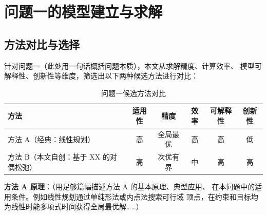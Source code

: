 %
%

\section{问题一的模型建立与求解}

\subsection{方法对比与选择}


针对问题一（此处用一句话概括问题本质），本文从求解精度、计算效率、
模型可解释性、创新性等维度，筛选出以下两种候选方法进行对比：

\begin{table}[htbp]
  \centering
  \caption{问题一候选方法对比}
  \label{tab:q1_methods}
  \begin{tabular}{lccccc}
    \toprule
    \textbf{方法} & \textbf{适用性} & \textbf{精度} & \textbf{效率} & \textbf{可解释性} & \textbf{创新性} \\
    \midrule
    方法 A（经典：线性规划）           & 高 & 全局最优   & 高 & 高 & 低 \\
    方法 B（本文自创：基于 XX 的对偶松弛） & 高 & 次优有界   & 中 & 高 & 高 \\
    \bottomrule
  \end{tabular}
\end{table}

\textbf{方法 A 原理}：（用足够篇幅描述方法 A 的基本原理、典型应用、
在本问题中的适用条件。例如线性规划通过单纯形法或内点法搜索可行域
顶点，在约束和目标均为线性时能多项式时间获得全局最优解……）

